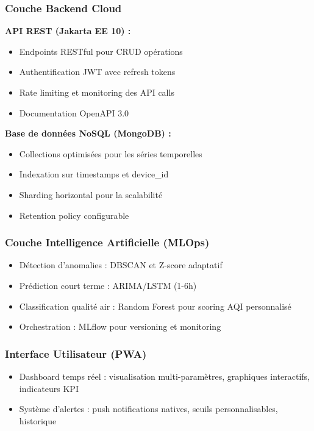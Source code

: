\documentclass[12pt,a4paper]{article}
\begin{document}
\subsubsection{Couche Backend Cloud}
\textbf{API REST (Jakarta EE 10) :}
\begin{itemize}
    \item Endpoints RESTful pour CRUD opérations
    \item Authentification JWT avec refresh tokens
    \item Rate limiting et monitoring des API calls
    \item Documentation OpenAPI 3.0
\end{itemize}

\textbf{Base de données NoSQL (MongoDB) :}
\begin{itemize}
    \item Collections optimisées pour les séries temporelles
    \item Indexation sur timestamps et device\_id
    \item Sharding horizontal pour la scalabilité
    \item Retention policy configurable
\end{itemize}

\subsubsection{Couche Intelligence Artificielle (MLOps)}
\begin{itemize}
    \item Détection d'anomalies : DBSCAN et Z-score adaptatif
    \item Prédiction court terme : ARIMA/LSTM (1-6h)
    \item Classification qualité air : Random Forest pour scoring AQI personnalisé
    \item Orchestration : MLflow pour versioning et monitoring
\end{itemize}

\subsubsection{Interface Utilisateur (PWA)}
\begin{itemize}
    \item Dashboard temps réel : visualisation multi-paramètres, graphiques interactifs, indicateurs KPI
    \item Système d'alertes : push notifications natives, seuils personnalisables, historique
\end{itemize}
\end{document}
